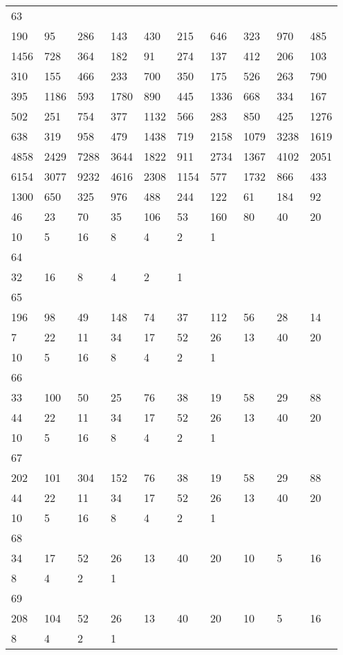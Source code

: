 \begin{longtable}{*{10}{l}}
63&&&&&&&&&\\
190& 95& 286& 143& 430& 215& 646& 323& 970& 485\\
1456& 728& 364& 182& 91& 274& 137& 412& 206& 103\\
310& 155& 466& 233& 700& 350& 175& 526& 263& 790\\
395& 1186& 593& 1780& 890& 445& 1336& 668& 334& 167\\
502& 251& 754& 377& 1132& 566& 283& 850& 425& 1276\\
638& 319& 958& 479& 1438& 719& 2158& 1079& 3238& 1619\\
4858& 2429& 7288& 3644& 1822& 911& 2734& 1367& 4102& 2051\\
6154& 3077& 9232& 4616& 2308& 1154& 577& 1732& 866& 433\\
1300& 650& 325& 976& 488& 244& 122& 61& 184& 92\\
46& 23& 70& 35& 106& 53& 160& 80& 40& 20\\
10& 5& 16& 8& 4& 2& 1& \\

64&&&&&&&&&\\
32& 16& 8& 4& 2& 1& \\

65&&&&&&&&&\\
196& 98& 49& 148& 74& 37& 112& 56& 28& 14\\
7& 22& 11& 34& 17& 52& 26& 13& 40& 20\\
10& 5& 16& 8& 4& 2& 1& \\

66&&&&&&&&&\\
33& 100& 50& 25& 76& 38& 19& 58& 29& 88\\
44& 22& 11& 34& 17& 52& 26& 13& 40& 20\\
10& 5& 16& 8& 4& 2& 1& \\

67&&&&&&&&&\\
202& 101& 304& 152& 76& 38& 19& 58& 29& 88\\
44& 22& 11& 34& 17& 52& 26& 13& 40& 20\\
10& 5& 16& 8& 4& 2& 1& \\

68&&&&&&&&&\\
34& 17& 52& 26& 13& 40& 20& 10& 5& 16\\
8& 4& 2& 1& \\

69&&&&&&&&&\\
208& 104& 52& 26& 13& 40& 20& 10& 5& 16\\
8& 4& 2& 1& \\


\end{longtable}
